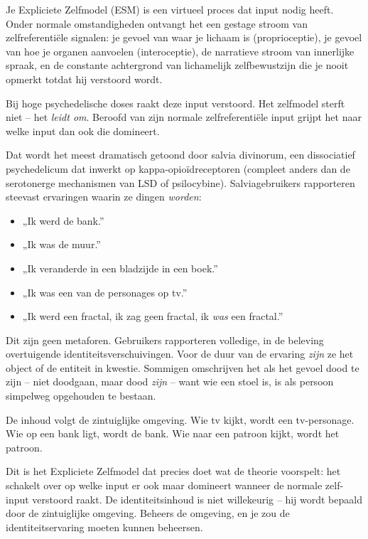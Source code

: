 \documentclass[11pt, twoside, openright]{book}
\begin{document}
Je Expliciete Zelfmodel (ESM) is een virtueel proces dat input nodig heeft. Onder normale omstandigheden ontvangt het een gestage stroom van zelfreferentiële signalen: je gevoel van waar je lichaam is (proprioceptie), je gevoel van hoe je organen aanvoelen (interoceptie), de narratieve stroom van innerlijke spraak, en de constante achtergrond van lichamelijk zelfbewustzijn die je nooit opmerkt totdat hij verstoord wordt.

Bij hoge psychedelische doses raakt deze input verstoord. Het zelfmodel sterft niet -- het \textit{leidt om}. Beroofd van zijn normale zelfreferentiële input grijpt het naar welke input dan ook die domineert.

Dat wordt het meest dramatisch getoond door salvia divinorum, een dissociatief psychedelicum dat inwerkt op kappa-opioïdreceptoren (compleet anders dan de serotonerge mechanismen van LSD of psilocybine). Salviagebruikers rapporteren steevast ervaringen waarin ze dingen \textit{worden}:

\begin{itemize}
  \item „Ik werd de bank.”
  \item „Ik was de muur.”
  \item „Ik veranderde in een bladzijde in een boek.”
  \item „Ik was een van de personages op tv.”
  \item „Ik werd een fractal, ik zag geen fractal, ik \textit{was} een fractal.”
\end{itemize}

Dit zijn geen metaforen. Gebruikers rapporteren volledige, in de beleving overtuigende identiteitsverschuivingen. Voor de duur van de ervaring \textit{zijn} ze het object of de entiteit in kwestie. Sommigen omschrijven het als het gevoel dood te zijn -- niet doodgaan, maar dood \textit{zijn} -- want wie een stoel is, is als persoon simpelweg opgehouden te bestaan.

De inhoud volgt de zintuiglijke omgeving. Wie tv kijkt, wordt een tv-personage. Wie op een bank ligt, wordt de bank. Wie naar een patroon kijkt, wordt het patroon.

Dit is het Expliciete Zelfmodel dat precies doet wat de theorie voorspelt: het schakelt over op welke input er ook maar domineert wanneer de normale zelf-input verstoord raakt. De identiteitsinhoud is niet willekeurig -- hij wordt bepaald door de zintuiglijke omgeving. Beheers de omgeving, en je zou de identiteitservaring moeten kunnen beheersen.
\end{document}
